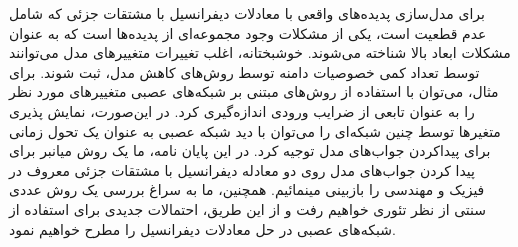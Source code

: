 برای مدل‌سازی پدیده‌های واقعی با معادلات دیفرانسیل با مشتقات جزئی که شامل عدم قطعیت است، یکی از مشکلات وجود مجموعه‌ای از پدیده‌ها است که به عنوان مشکلات ابعاد بالا شناخته می‌شوند. خوشبختانه، اغلب تغییرات متغییرهای مدل می‌توانند توسط تعداد کمی خصوصیات دامنه توسط روش‌های کاهش مدل، ثبت شوند. برای مثال، می‌توان با استفاده از روش‌های مبتنی بر شبکه‌های عصبی متغییرهای مورد نظر را به عنوان تابعی از ضرایب ورودی اندازه‌گیری کرد. در این‌صورت، نمایش پذیری متغیرها توسط چنین شبکه‌ای را می‌توان با دید شبکه عصبی به عنوان یک تحول زمانی برای پیداکردن جواب‌های مدل توجیه کرد. در این پایان نامه، ما یک روش میانبر برای پیدا کردن جواب‌های مدل روی دو معادله دیفرانسیل با مشتقات جزئی معروف در فیزیک و مهندسی را بازبینی مینمائیم. همچنین، ما به سراغ بررسی یک روش عددی سنتی از نظر تئوری خواهیم رفت و از این طریق، احتمالات جدیدی برای استفاده از شبکه‌های عصبی در حل معادلات دیفرانسیل را مطرح خواهیم نمود.


